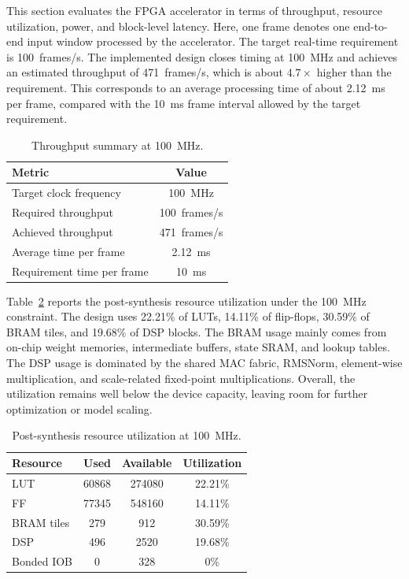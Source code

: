\documentclass[11pt,twoside]{eitExjobb}
\begin{document}
This section evaluates the FPGA accelerator in terms of throughput, resource
utilization, power, and block-level latency. Here, one frame denotes one end-to-end
input window processed by the accelerator. The target real-time requirement is
100~frames/s. The implemented design closes timing at 100~MHz and achieves an estimated
throughput of 471~frames/s, which is about \(4.7\times\) higher than the requirement.
This corresponds to an average processing time of about 2.12~ms per frame, compared with
the 10~ms frame interval allowed by the target requirement.

\begin{table}[H]
\caption{Throughput summary at 100~MHz.}
\label{tab:throughput_summary}
\centering
\small
\begin{tabular}{l c}
\hline
\textbf{Metric} & \textbf{Value} \\
\hline
Target clock frequency & 100~MHz \\
Required throughput & 100~frames/s \\
Achieved throughput & 471~frames/s \\
Average time per frame & 2.12~ms \\
Requirement time per frame & 10~ms \\
\hline
\end{tabular}
\end{table}

Table~\ref{tab:resource_utilization} reports the post-synthesis resource utilization
under the 100~MHz constraint. The design uses 22.21\% of LUTs, 14.11\% of flip-flops,
30.59\% of BRAM tiles, and 19.68\% of DSP blocks. The BRAM usage mainly comes from
on-chip weight memories, intermediate buffers, state SRAM, and lookup tables. The DSP
usage is dominated by the shared MAC fabric, RMSNorm, element-wise multiplication, and
scale-related fixed-point multiplications. Overall, the utilization remains well below
the device capacity, leaving room for further optimization or model scaling.

\begin{table}[H]
\caption{Post-synthesis resource utilization at 100~MHz.}
\label{tab:resource_utilization}
\centering
\small
\begin{tabular}{l c c c}
\hline
\textbf{Resource} & \textbf{Used} & \textbf{Available} & \textbf{Utilization} \\
\hline
LUT & 60868 & 274080 & 22.21\% \\
FF & 77345 & 548160 & 14.11\% \\
BRAM tiles & 279 & 912 & 30.59\% \\
DSP & 496 & 2520 & 19.68\% \\
Bonded IOB & 0 & 328 & 0\% \\
\hline
\end{tabular}
\end{table}
\end{document}
